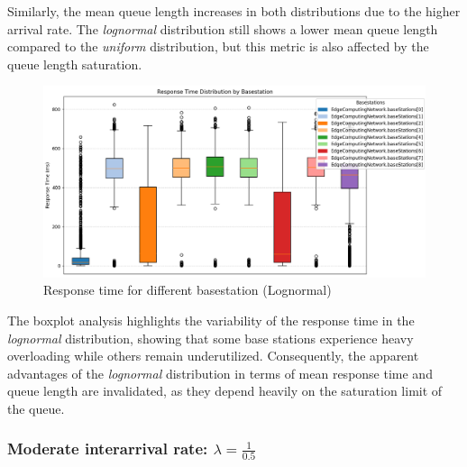 \documentclass{report}
\begin{document}
\begin{flushleft}
Similarly, the mean queue length increases in both distributions due to the higher arrival rate. The \emph{lognormal} distribution still shows a lower mean queue length compared to the \emph{uniform} distribution, but this metric is also affected by the queue length saturation.    
\end{flushleft}


\begin{figure}[H]
    \centering
    \includegraphics[width=\textwidth]{img/plots/I-vary/R_Box_Log_A_I01.png}
    \caption{Response time for different basestation (Lognormal)}
\end{figure}

\begin{flushleft}
The boxplot analysis highlights the variability of the response time in the \emph{lognormal} distribution, showing that some base stations experience heavy overloading while others remain underutilized. Consequently, the apparent advantages of the \emph{lognormal} distribution in terms of mean response time and queue length are invalidated, as they depend heavily on the saturation limit of the queue.

\end{flushleft}

\vspace{10mm}

\subsubsection*{Moderate interarrival rate: $\lambda = \frac{1}{0.5}$} 
\end{document}
